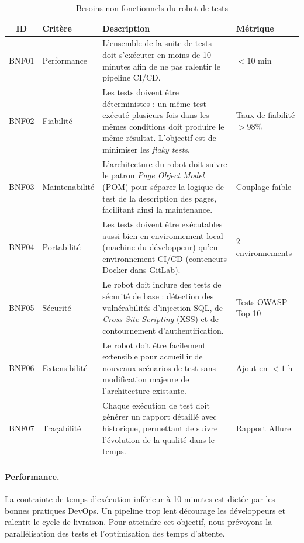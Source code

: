 \begin{table}[H]
\centering
\caption{Besoins non fonctionnels du robot de tests}
\label{tab:besoins-non-fonctionnels}
\renewcommand{\arraystretch}{1.3}
\begin{tabularx}{\textwidth}{|c|l|X|l|}
\hline
\rowcolor{speedlineBlue!15}
\textbf{ID} & \textbf{Critère} & \textbf{Description} & \textbf{Métrique} \\
\hline
BNF01 & Performance & L'ensemble de la suite de tests doit s'exécuter en moins de 10 minutes afin de ne pas ralentir le pipeline CI/CD. & $< 10$ min \\
\hline
BNF02 & Fiabilité & Les tests doivent être déterministes : un même test exécuté plusieurs fois dans les mêmes conditions doit produire le même résultat. L'objectif est de minimiser les \textit{flaky tests}. & Taux de fiabilité $> 98\%$ \\
\hline
BNF03 & Maintenabilité & L'architecture du robot doit suivre le patron \textit{Page Object Model} (POM) pour séparer la logique de test de la description des pages, facilitant ainsi la maintenance. & Couplage faible \\
\hline
BNF04 & Portabilité & Les tests doivent être exécutables aussi bien en environnement local (machine du développeur) qu'en environnement CI/CD (conteneurs Docker dans GitLab). & 2 environnements \\
\hline
BNF05 & Sécurité & Le robot doit inclure des tests de sécurité de base : détection des vulnérabilités d'injection SQL, de \textit{Cross-Site Scripting} (XSS) et de contournement d'authentification. & Tests OWASP Top 10 \\
\hline
BNF06 & Extensibilité & Le robot doit être facilement extensible pour accueillir de nouveaux scénarios de test sans modification majeure de l'architecture existante. & Ajout en $< 1$ h \\
\hline
BNF07 & Traçabilité & Chaque exécution de test doit générer un rapport détaillé avec historique, permettant de suivre l'évolution de la qualité dans le temps. & Rapport Allure \\
\hline
\end{tabularx}
\end{table}

\paragraph{Performance.}
La contrainte de temps d'exécution inférieur à 10 minutes est dictée par les bonnes pratiques DevOps. Un pipeline trop lent décourage les développeurs et ralentit le cycle de livraison. Pour atteindre cet objectif, nous prévoyons la parallélisation des tests et l'optimisation des temps d'attente.

